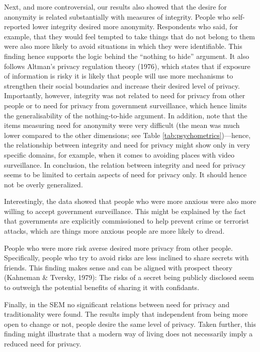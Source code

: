 \documentclass[man,floatsintext]{apa6}
\begin{document}
Next, and more controversial, our results also showed that the desire for anonymity is related substantially with measures of integrity. People who self-reported lower integrity desired more anonymity. Respondents who said, for example, that they would feel tempted to take things that do not belong to them were also more likely to avoid situations in which they were identifiable. This finding hence supports the logic behind the \enquote{nothing to hide} argument. It also follows Altman's privacy regulation theory (1976), which states that if exposure of information is risky it is likely that people will use more mechanisms to strengthen their social boundaries and increase their desired level of privacy. Importantly, however, integrity was not related to need for privacy from other people or to need for privacy from government surveillance, which hence limits the generalisability of the nothing-to-hide argument. In addition, note that the items measuring need for anonymity were very difficult (the mean was much lower compared to the other dimensions; see Table \ref{tab:psychometrics})---hence, the relationship between integrity and need for privacy might show only in very specific domains, for example, when it comes to avoiding places with video surveillance. In conclusion, the relation between integrity and need for privacy seems to be limited to certain aspects of need for privacy only. It should hence not be overly generalized.

Interestingly, the data showed that people who were more anxious were also more willing to accept government surveillance. This might be explained by the fact that governments are explicitly commissioned to help prevent crime or terrorist attacks, which are things more anxious people are more likely to dread.

People who were more risk averse desired more privacy from other people. Specifically, people who try to avoid risks are less inclined to share secrets with friends. This finding makes sense and can be aligned with prospect theory (Kahneman \& Tversky, 1979): The risks of a secret being publicly disclosed seem to outweigh the potential benefits of sharing it with confidants.

Finally, in the SEM no significant relations between need for privacy and traditionality were found. The results imply that independent from being more open to change or not, people desire the same level of privacy. Taken further, this finding might illustrate that a modern way of living does not necessarily imply a reduced need for privacy.
\end{document}
